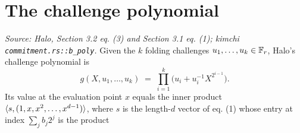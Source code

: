 \section{The challenge polynomial}

\begin{definition}
  \label{def:ipa_bpoly}
  \textit{Source: Halo, Section 3.2 eq. (3) and Section 3.1 eq. (1); kimchi
  \texttt{commitment.rs::b\_poly}.}
  Given the \(k\) folding challenges \(u_{1}, \dots, u_{k} \in \mathbb{F}_r\), Halo's
  challenge polynomial is
  \[
    g(X, u_{1}, \dots, u_{k}) \;=\; \prod_{i=1}^{k}
      \bigl(u_{i} + u_{i}^{-1} X^{2^{i-1}}\bigr).
  \]
  Its value at the evaluation point \(x\) equals the inner product
  \(\langle s, (1, x, x^{2}, \dots, x^{d-1}) \rangle\), where \(s\) is the length-\(d\)
  vector of eq. (1) whose entry at index \(\sum_{j} b_{j} 2^{j}\) is the product

\end{definition}
